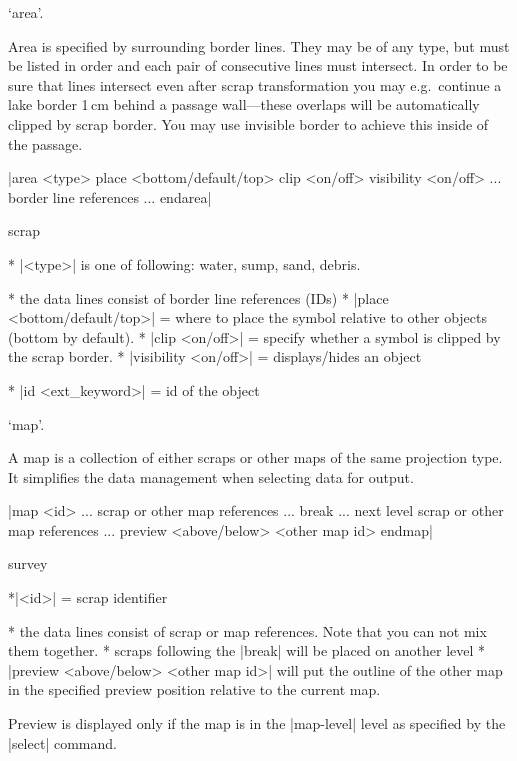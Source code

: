\subsubchapter `area'.

\description
Area is specified by surrounding border lines. They may be of any type, but 
must be listed in order and each pair of consecutive lines must intersect. 
In order to be sure that lines intersect even after scrap transformation
you may e.g.~continue a lake border 1\,cm behind a passage wall---these 
overlaps will be automatically clipped by scrap border.
You may use invisible border to achieve this inside of the passage.


\enddescription

\syntax
  |area <type>
         place <bottom/default/top>
         clip <on/off>
         visibility <on/off>
       ... border line references ...
       endarea|
\endsyntax

\context
  scrap
\endcontext

\arguments
  * |<type>| is one of following: water, sump, sand, debris.
\endarguments

\comopt
  * the data lines consist of border line references (IDs)
  * |place <bottom/default/top>| = where to place the symbol relative
    to other objects (bottom by default).
  * |clip <on/off>| = specify whether a symbol is clipped by the scrap border.
  * |visibility <on/off>| = displays/hides an object
\endcomopt

\options
  * |id <ext_keyword>| = id of the object
\endoptions


\subsubchapter `map'.

\description
  A map is a collection of either scraps or other maps of the same projection type.
  It simplifies the data management when selecting data for output.
\enddescription

\syntax
  |map <id>
        ... scrap or other map references ...
        break
        ... next level scrap or other map references ...
        preview <above/below> <other map id>
      endmap|
\endsyntax

\context
  survey
\endcontext

\arguments
  *|<id>| = scrap identifier
\endarguments

\comopt
  * the data lines consist of scrap or map references. Note that
    you can not mix them together.
  * scraps following the |break| will be placed on another level
  * |preview <above/below> <other map id>| will put the outline of
    the other map in the specified preview position relative to the
    current map. 

    Preview is displayed only if the map is in the |map-level| level as
    specified by the |select| command.
    
